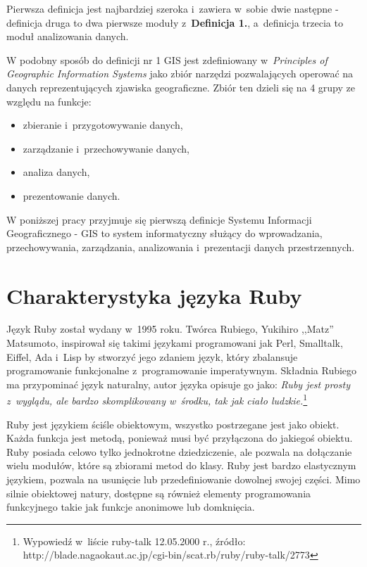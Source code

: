 \documentclass[printmode]{mgr}
\begin{document}
Pierwsza definicja jest najbardziej szeroka i~zawiera w~sobie dwie następne - definicja druga to dwa pierwsze moduły z~\textbf{Definicja 1.}, a~definicja trzecia to moduł analizowania danych.

W podobny sposób do definicji nr 1 GIS jest zdefiniowany w~\emph{Principles of Geographic Information Systems} \cite{principles_gis} jako zbiór narzędzi pozwalających operować na danych reprezentujących zjawiska geograficzne. Zbiór ten dzieli się na 4 grupy ze względu na funkcje:
  \begin{itemize}
    \item zbieranie i~przygotowywanie danych,
    \item zarządzanie i~przechowywanie danych,
    \item analiza danych,
    \item prezentowanie danych.
  \end{itemize}

W poniższej pracy przyjmuje się pierwszą definicje Systemu Informacji Geograficznego - GIS to system informatyczny służący do wprowadzania, przechowywania, zarządzania, analizowania i~prezentacji danych przestrzennych.

\section{Charakterystyka języka Ruby}
Język Ruby został wydany w~1995 roku. Twórca Rubiego, Yukihiro ,,Matz'' Matsumoto, inspirował się takimi językami programowani jak Perl, Smalltalk, Eiffel, Ada i~Lisp by stworzyć jego zdaniem język, który zbalansuje programowanie funkcjonalne z~programowanie imperatywnym. \cite{doc_ruby} Składnia Rubiego ma przypominać język naturalny, autor języka opisuje go jako: \emph{Ruby jest prosty z~wyglądu, ale bardzo skomplikowany w~środku, tak jak ciało ludzkie.}\footnote{Wypowiedź w~liście ruby-talk 12.05.2000 r., źródło: \\http://blade.nagaokaut.ac.jp/cgi-bin/scat.rb/ruby/ruby-talk/2773}

Ruby jest językiem ściśle obiektowym, wszystko postrzegane jest jako obiekt. Każda funkcja jest metodą, ponieważ musi być przyłączona do jakiegoś obiektu. Ruby posiada celowo tylko jednokrotne dziedziczenie, ale pozwala na dołączanie wielu modułów, które są zbiorami metod do klasy. Ruby jest bardzo elastycznym językiem, pozwala na usunięcie lub przedefiniowanie dowolnej swojej części. Mimo silnie obiektowej natury, dostępne są również elementy programowania funkcyjnego takie jak funkcje anonimowe lub domknięcia.
\end{document}
